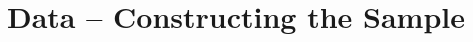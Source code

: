 \documentclass[12pt]{article}
\begin{document}

\section{Data -- Constructing the Sample}
\end{document}
